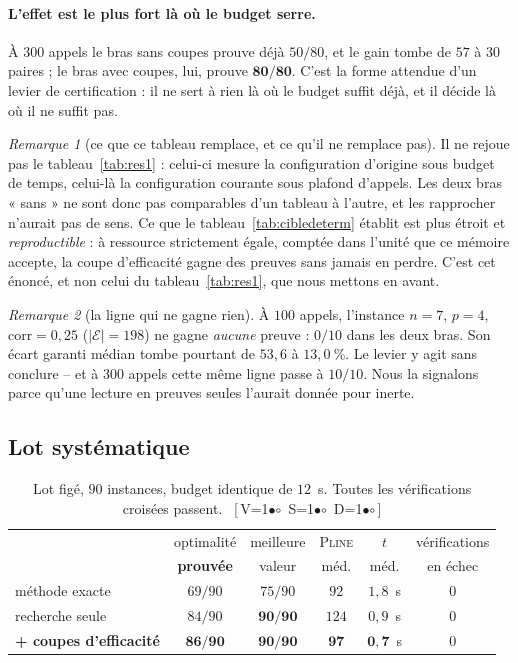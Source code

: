 \documentclass[11pt,a4paper]{article}
\theoremstyle{plain}
\theoremstyle{remark}
\newtheorem{remark}{Remarque}
\newcommand{\Ecal}{\mathcal{E}}
\newcommand{\ILP}{\textsc{Pline}}
\newcommand{\cfgm}[1]{\ifnum#1=1$\bullet$\else$\circ$\fi}
\newcommand{\conf}[3]{%
  \textsf{\footnotesize[\,V\cfgm{#1}\ S\cfgm{#2}\ D\cfgm{#3}\,]}}
\begin{document}
\paragraph{L'effet est le plus fort là où le budget serre.} À $300$ appels
le bras sans coupes prouve déjà $50/80$, et le gain tombe de $57$ à $30$
paires ; le bras avec coupes, lui, prouve $\mathbf{80/80}$. C'est la forme
attendue d'un levier de certification : il ne sert à rien là où le budget
suffit déjà, et il décide là où il ne suffit pas.

\begin{remark}[ce que ce tableau remplace, et ce qu'il ne remplace pas]
Il ne rejoue pas le tableau~\ref{tab:res1} : celui-ci mesure la
configuration d'origine sous budget de temps, celui-là la configuration
courante sous plafond d'appels. Les deux bras « sans » ne sont donc pas
comparables d'un tableau à l'autre, et les rapprocher n'aurait pas de sens.
Ce que le tableau~\ref{tab:cibledeterm} établit est plus étroit et
\emph{reproductible} : à ressource strictement égale, comptée dans l'unité
que ce mémoire accepte, la coupe d'efficacité gagne des preuves sans jamais
en perdre. C'est cet énoncé, et non celui du tableau~\ref{tab:res1}, que nous
mettons en avant.
\end{remark}

\begin{remark}[la ligne qui ne gagne rien]
À $100$ appels, l'instance $n=7$, $p=4$, $\text{corr}=0{,}25$ ($|\Ecal|=198$)
ne gagne \emph{aucune} preuve : $0/10$ dans les deux bras. Son écart garanti
médian tombe pourtant de $53{,}6$ à $13{,}0\ \%$. Le levier y agit sans
conclure -- et à $300$ appels cette même ligne passe à $10/10$. Nous la
signalons parce qu'une lecture en preuves seules l'aurait donnée pour
inerte.
\end{remark}

\subsection{Lot systématique}

\begin{table}[H]
\centering
\caption{Lot figé, $90$ instances, budget identique de $12$~s. Toutes les
vérifications croisées passent.\ \conf{0}{0}{0}}
\label{tab:res2}
\setlength{\tabcolsep}{6pt}
\begin{tabular}{lccccc}
\toprule
& optimalité & meilleure & \ILP & $t$ & vérifications\\
& \textbf{prouvée} & valeur & méd. & méd. & en échec\\
\midrule
méthode exacte      & $69/90$ & $75/90$ & $92$  & $1{,}8$~s & 0\\
recherche seule     & $84/90$ & $\mathbf{90/90}$ & $124$ & $0{,}9$~s & 0\\
\textbf{+ coupes d'efficacité} & $\mathbf{86/90}$ & $\mathbf{90/90}$
                    & $\mathbf{97}$ & $\mathbf{0{,}7}$~s & 0\\
\bottomrule
\end{tabular}
\end{table}
\end{document}
